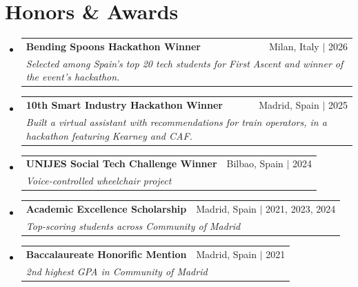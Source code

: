 \documentclass[a4paper,11pt]{article}
\makeatletter
\newcommand{\resumeAward}[3]{
  \vspace{-2pt}\item
    \begin{tabular*}{0.97\textwidth}[t]{l@{\extracolsep{\fill}}r}
      \textbf{#1} & #2 \\
      \multicolumn{2}{l}{\textit{\small#3}} \\
    \end{tabular*}\vspace{-7pt}
}
\newcommand{\resumeSubHeadingListStart}{\begin{itemize}[leftmargin=0.15in, label={}]}
\newcommand{\resumeSubHeadingListEnd}{\end{itemize}}
\makeatother
\begin{document}
\section{Honors \& Awards}
\resumeSubHeadingListStart
\resumeAward
    {Bending Spoons Hackathon Winner}{Milan, Italy $|$ 2026}
    {Selected among Spain's top 20 tech students for First Ascent and winner of the event's hackathon.}
\resumeAward
    {10th Smart Industry Hackathon Winner}{Madrid, Spain $|$ 2025}
    {Built a virtual assistant with recommendations for train operators, in a hackathon featuring Kearney and CAF.}
  \resumeAward
    {UNIJES Social Tech Challenge Winner}{Bilbao, Spain $|$ 2024}
    {Voice-controlled wheelchair project}
\resumeAward
    {Academic Excellence Scholarship}{Madrid, Spain $|$ 2021, 2023, 2024}
    {Top-scoring students across Community of Madrid}
\resumeAward
    {Baccalaureate Honorific Mention}{Madrid, Spain $|$ 2021}
    {2nd highest GPA in Community of Madrid}
  
\resumeSubHeadingListEnd
\end{document}
